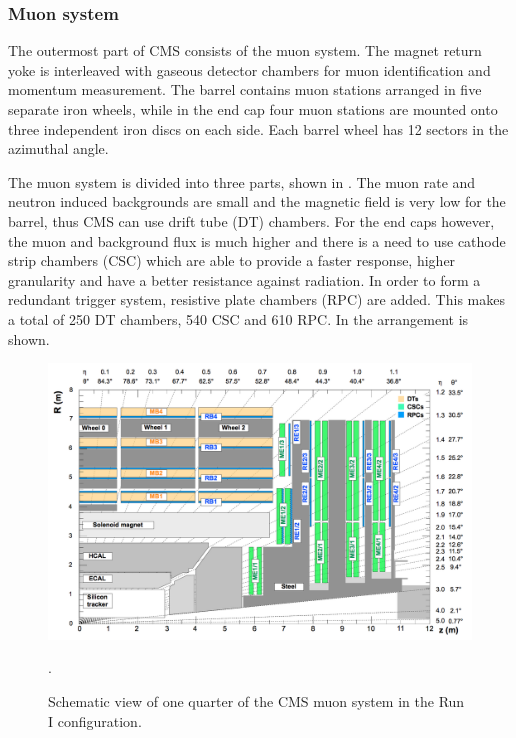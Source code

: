 \clearpage
\subsubsection{Muon system}
The outermost part of CMS consists of the muon system. The magnet return yoke is interleaved with gaseous detector chambers for muon identification and momentum measurement. The barrel contains muon stations arranged in five separate iron wheels, while in the end cap four muon stations are mounted onto three independent iron discs on each side. Each barrel wheel has 12 sectors in the azimuthal angle. 

The muon system is divided into three parts, shown in \cite{Chatrchyan:1223944}. The muon rate and neutron induced backgrounds are small and the magnetic field is very low for the barrel, thus CMS can use drift tube (DT) chambers. For the end caps however, the muon and background flux is much higher and there is a need to use cathode strip chambers (CSC) which are able to provide a faster response, higher granularity and have a better resistance against radiation. In order to form a redundant trigger system, resistive plate chambers (RPC) are added. This makes a total of 250 DT chambers, 540 CSC and 610 RPC. In  the arrangement is shown.


\begin{figure}[ht!]
	\centering
	\includegraphics[width=1.\textwidth]{2_ExperimentalSetup/Figures/muonsys}
	\caption{Schematic view of one quarter of the CMS muon system in the Run I configuration. \cite{Chatrchyan:1223944}}.
	\label{fig:muonsys}
\end{figure}


